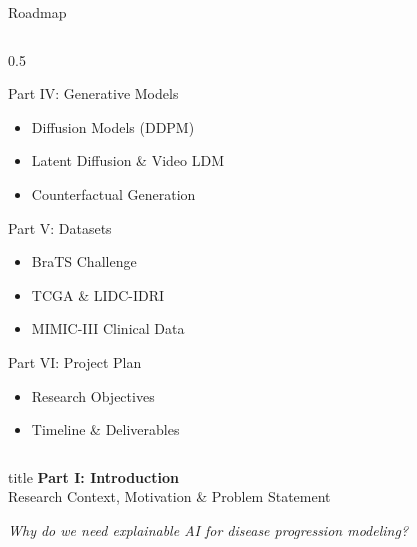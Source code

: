 \documentclass[aspectratio=169]{beamer}
\begin{document}
\begin{frame}{Roadmap}
\begin{columns}
\begin{column}{0.5\textwidth}
\begin{block}{Part IV: Generative Models}
                \begin{itemize}
                    \item Diffusion Models (DDPM)
                    \item Latent Diffusion \& Video LDM
                    \item Counterfactual Generation
                \end{itemize}
            \end{block}
            \begin{block}{Part V: Datasets}
                \begin{itemize}
                    \item BraTS Challenge
                    \item TCGA \& LIDC-IDRI
                    \item MIMIC-III Clinical Data
                \end{itemize}
            \end{block}
            \begin{block}{Part VI: Project Plan}
                \begin{itemize}
                    \item Research Objectives
                    \item Timeline \& Deliverables
                \end{itemize}
            \end{block}
        \end{column}
    \end{columns}
\end{frame}

\begin{frame}[plain]
    \centering
    \vfill
    \begin{beamercolorbox}[center,shadow=true,rounded=true]{title}
        \textbf{Part I: Introduction}\\
        \vspace{0.5em}
        \large Research Context, Motivation \& Problem Statement
    \end{beamercolorbox}
    \vfill
    
    \vspace{1em}
    \normalsize
    \textit{Why do we need explainable AI for disease progression modeling?}
\end{frame}
\end{document}
